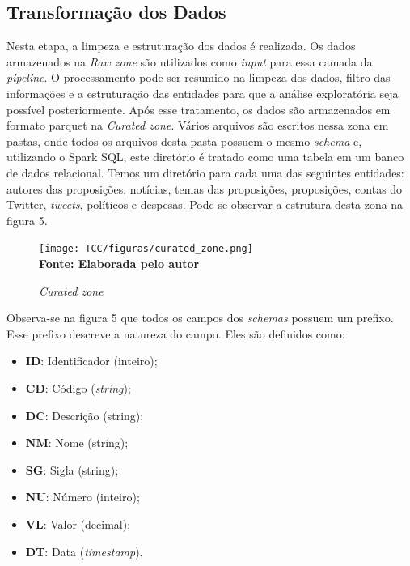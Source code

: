 \subsection{Transformação dos Dados} Nesta etapa, a limpeza e estruturação dos dados é realizada. Os dados armazenados na \textit{Raw zone} são utilizados como \textit{input} para essa camada da \textit{pipeline}. O processamento pode ser resumido na limpeza dos dados, filtro das informações e a estruturação das entidades para que a análise exploratória seja possível posteriormente. Após esse tratamento, os dados são armazenados em formato parquet na \textit{Curated zone}. Vários arquivos são escritos nessa zona em pastas, onde todos os arquivos desta pasta possuem o mesmo \textit{schema} e, utilizando o Spark SQL, este diretório é tratado como uma tabela em um banco de dados relacional. Temos um diretório para cada uma das seguintes entidades: autores das proposições, notícias, temas das proposições, proposições, contas do Twitter, \textit{tweets}, políticos e despesas. Pode-se observar a estrutura desta zona na figura 5.

\begin{figure}[H]
	\centering	
	\caption[\hspace{0.1cm}Zona Curated]{\textit{Curated zone}}
	  \vspace{-0.4cm}
	\texttt{[image: TCC/figuras/curated\_zone.png]}
	 \vspace{-0.3cm}
	\\\textbf{\footnotesize Fonte: Elaborada pelo autor}
	\label{fig:tela1}
\end{figure}

Observa-se na figura 5 que todos os campos dos \textit{schemas} possuem um prefixo. Esse prefixo descreve a natureza do campo. Eles são definidos como: 

\begin{itemize}
\item \textbf{ID}: Identificador (inteiro);
\item \textbf{CD}: Código (\textit{string});
\item \textbf{DC}: Descrição (string);
\item \textbf{NM}: Nome (string);
\item \textbf{SG}: Sigla (string);
\item \textbf{NU}: Número (inteiro);
\item \textbf{VL}: Valor (decimal);
\item \textbf{DT}: Data (\textit{timestamp}).
\end{itemize}


